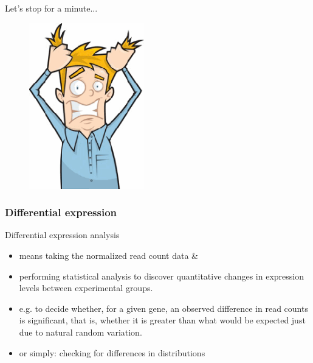 \documentclass{beamer}\usepackage[]{graphicx}\usepackage[]{color}
\begin{document}
\begin{frame}
Let's stop for a minute...
\begin{center}
\begin{figure}
\includegraphics[width=5cm]{Images/frustration.png}
\end{figure}
\end{center}
\end{frame}

\begin{frame}
\frametitle{Differential expression}
Differential expression analysis
\begin{itemize}
\item means taking the normalized read count data \&
\item performing statistical analysis to discover quantitative changes in expression levels between experimental groups. \item e.g. to decide whether, for a given gene, an observed difference in read counts is significant, that is, whether it is greater than what would be expected just due to natural random variation.
\item or simply: checking for differences in distributions
\end{itemize}
\end{frame}
\end{document}
